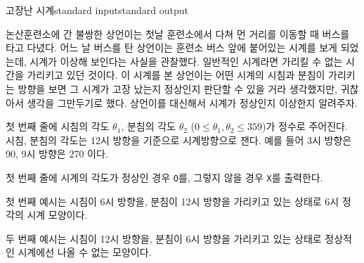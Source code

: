 \begin{problem}{고장난 시계}{standard input}{standard output}

논산훈련소에 간 불쌍한 상언이는 첫날 훈련소에서 다쳐 먼 거리를 이동할 때 버스를 타고 다녔다. 어느 날 버스를 탄 상언이는 훈련소 버스 앞에 붙어있는 시계를 보게 되었는데, 시계가 이상해 보인다는 사실을 관찰했다. 일반적인 시계라면 가리킬 수 없는 시간을 가리키고 있던 것이다. 이 시계를 본 상언이는 어떤 시계의 시침과 분침이 가리키는 방향을 보면 그 시계가 고장 났는지 정상인지 판단할 수 있을 거라 생각했지만, 귀찮아서 생각을 그만두기로 했다. 상언이를 대신해서 시계가 정상인지 이상한지 알려주자.


\InputFile
첫 번째 줄에 시침의 각도 $\theta_1$, 분침의 각도 $\theta_2$ ($0 \le \theta_1, \theta_2 \le 359$)가 정수로 주어진다.
시침, 분침의 각도는 12시 방향을 기준으로 시계방향으로 잰다. 예를 들어 3시 방향은 90, 9시 방향은 270 이다.

\OutputFile
첫 번째 줄에 시계의 각도가 정상인 경우 \texttt{O}를, 그렇지 않을 경우 \texttt{X}를 출력한다.

\Example

\begin{example}
%
%
\end{example}

\Notes
첫 번째 예시는 시침이 6시 방향을, 분침이 12시 방향을 가리키고 있는 상태로 6시 정각의 시계 모양이다.

두 번째 예시는 시침이 12시 방향을, 분침이 6시 방향을 가리키고 있는 상태로 정상적인 시계에선 나올 수 없는 모양이다.

\end{problem}
